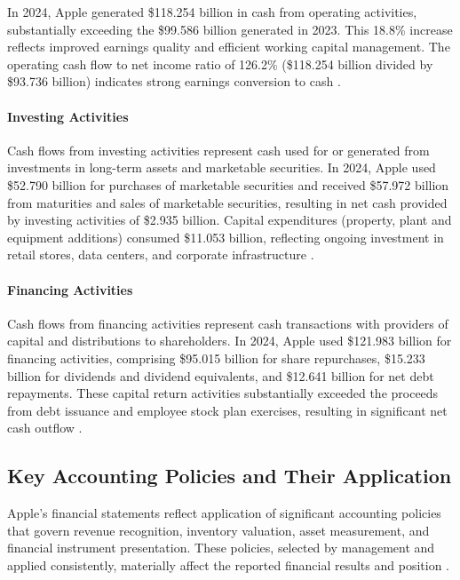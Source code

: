 \documentclass[12pt,a4paper]{article}
\begin{document}
In 2024, Apple generated \$118.254 billion in cash from operating activities, substantially exceeding the \$99.586 billion generated in 2023. This 18.8\% increase reflects improved earnings quality and efficient working capital management. The operating cash flow to net income ratio of 126.2\% (\$118.254 billion divided by \$93.736 billion) indicates strong earnings conversion to cash \citep{apple202410k}.

\paragraph{Investing Activities}

Cash flows from investing activities represent cash used for or generated from investments in long-term assets and marketable securities. In 2024, Apple used \$52.790 billion for purchases of marketable securities and received \$57.972 billion from maturities and sales of marketable securities, resulting in net cash provided by investing activities of \$2.935 billion. Capital expenditures (property, plant and equipment additions) consumed \$11.053 billion, reflecting ongoing investment in retail stores, data centers, and corporate infrastructure \citep{apple202410k}.

\paragraph{Financing Activities}

Cash flows from financing activities represent cash transactions with providers of capital and distributions to shareholders. In 2024, Apple used \$121.983 billion for financing activities, comprising \$95.015 billion for share repurchases, \$15.233 billion for dividends and dividend equivalents, and \$12.641 billion for net debt repayments. These capital return activities substantially exceeded the proceeds from debt issuance and employee stock plan exercises, resulting in significant net cash outflow \citep{apple202410k}.

\subsection{Key Accounting Policies and Their Application}

Apple's financial statements reflect application of significant accounting policies that govern revenue recognition, inventory valuation, asset measurement, and financial instrument presentation. These policies, selected by management and applied consistently, materially affect the reported financial results and position \citep{kieso2023}.
\end{document}
